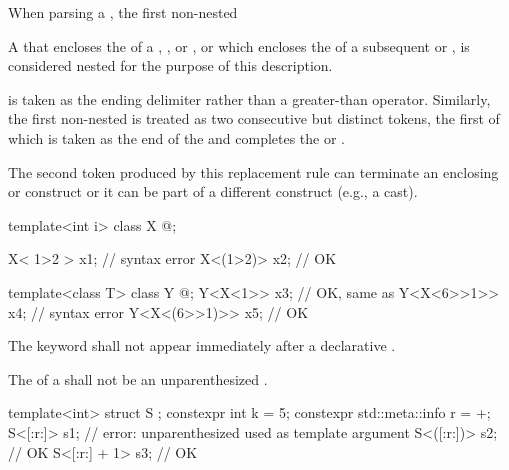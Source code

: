 \pnum
{}%
When parsing a ,
the first non-nested
\tcode{>}
\begin{footnote}
A \tcode{>} that encloses the 
of a , , 
or , or which encloses the 
of a subsequent  or
,
is considered nested for the purpose of this description.
\end{footnote}
is taken as the ending delimiter
rather than a greater-than operator.
Similarly, the first non-nested \tcode{>>} is treated as two
consecutive but distinct \tcode{>} tokens, the first of which is taken
as the end of the  and completes
the  or .
\begin{note}
The second \tcode{>}
token produced by this replacement rule can terminate an enclosing
 or 
construct or it can be part of a different construct (e.g., a cast).
\end{note}
\begin{example}
\begin{codeblock}
template<int i> class X { @\commentellip@ };

X< 1>2 > x1;                            // syntax error
X<(1>2)> x2;                            // OK

template<class T> class Y { @\commentellip@ };
Y<X<1>> x3;                             // OK, same as 
Y<X<6>>1>> x4;                          // syntax error
Y<X<(6>>1)>> x5;                        // OK
\end{codeblock}
\end{example}

\pnum
The keyword  shall not appear immediately after
a declarative .

\pnum
The  of a 
shall not be an unparenthesized .
\begin{example}
\begin{codeblock}
template<int> struct S { };
constexpr int k = 5;
constexpr std::meta::info r = ^^k;
S<[:r:]> s1;                        // error: unparenthesized  used as template argument
S<([:r:])> s2;                      // OK
S<[:r:] + 1> s3;                    // OK
\end{codeblock}
\end{example}

